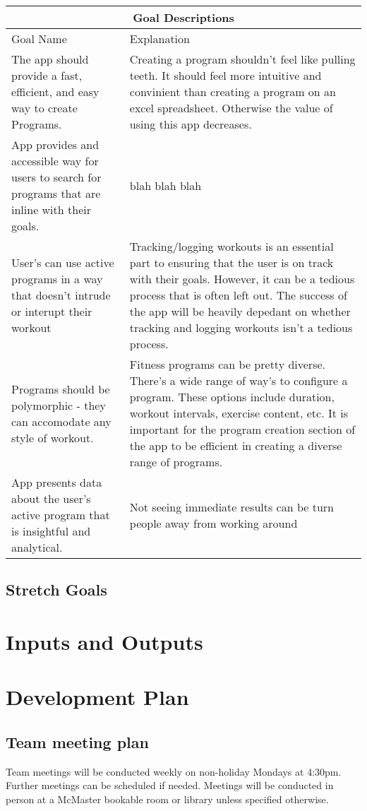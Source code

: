 \documentclass{article}
\begin{document}
	\begin{tabular}{ |p{5cm}|p{8cm}| }
	\hline
	\multicolumn{2}{|c|}{Goal Descriptions} \\
	\hline
	Goal Name & Explanation \\
	\hline
	The app should provide a fast, efficient, and easy way to create Programs. & Creating a program shouldn’t feel like pulling teeth. It should feel more intuitive and convinient than creating a program on an excel spreadsheet. Otherwise the value of using this app decreases.  \\
	\hline
	App provides and accessible way for users to search for programs that are inline with their goals. & blah blah blah \\
	\hline
	User’s can use active programs in a way that doesn’t intrude or interupt their workout & Tracking/logging workouts is an essential part to ensuring that the user is on track with their goals. However, it can be a tedious process that is often left out. The success of the app will be heavily depedant on whether tracking and logging workouts isn’t a tedious process. \\
	\hline
	Programs should be polymorphic - they can accomodate any style of workout. & Fitness programs can be pretty diverse. There’s a wide range of way’s to configure a program. These options include duration, workout intervals, exercise content, etc. It is important for the program creation section of the app to be efficient in creating a diverse range of programs. \\
  \hline
	App presents data about the user’s active program that is insightful and analytical. & Not seeing immediate results can be turn people away from working around \\
	\hline
\end{tabular}

\subsection{Stretch Goals}

\section{Inputs and Outputs}

\section {Development Plan}

\subsection{Team meeting plan}
Team meetings will be conducted weekly on non-holiday Mondays at 4:30pm.
Further meetings can be scheduled if needed.
Meetings will be conducted in person at a McMaster bookable room or library unless specified otherwise.
\end{document}
